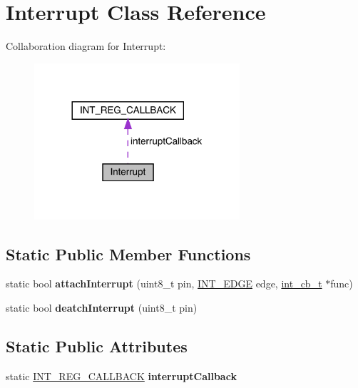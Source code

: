 \hypertarget{classInterrupt}{}\section{Interrupt Class Reference}
\label{classInterrupt}


Collaboration diagram for Interrupt\+:\nopagebreak
\begin{figure}[H]
\begin{center}
\leavevmode
\includegraphics[width=216pt]{classInterrupt__coll__graph}
\end{center}
\end{figure}
\subsection*{Static Public Member Functions}
\begin{DoxyCompactItemize}
\item 
\mbox{\label{classInterrupt_a00ff3f6de1e03971a6883b7cb72577e4}} 
static bool {\bfseries attach\+Interrupt} (uint8\+\_\+t pin, \hyperlink{interrupt_8h_affe9baf0034f4cbb8aec6ed2c42b1676}{I\+N\+T\+\_\+\+E\+D\+GE} edge, \hyperlink{interrupt_8h_af3e04027ddcd2e23670a55888d788d13}{int\+\_\+cb\+\_\+t} $\ast$func)
\item 
\mbox{\label{classInterrupt_a3e17ff585a7271441a17f1d5a7a95a47}} 
static bool {\bfseries deatch\+Interrupt} (uint8\+\_\+t pin)
\end{DoxyCompactItemize}
\subsection*{Static Public Attributes}
\begin{DoxyCompactItemize}
\item 
\mbox{\label{classInterrupt_ad98c7ff1c3a116c56b7c67b630967413}} 
static \hyperlink{structINT__REG__CALLBACK}{I\+N\+T\+\_\+\+R\+E\+G\+\_\+\+C\+A\+L\+L\+B\+A\+CK} {\bfseries interrupt\+Callback}
\end{DoxyCompactItemize}
